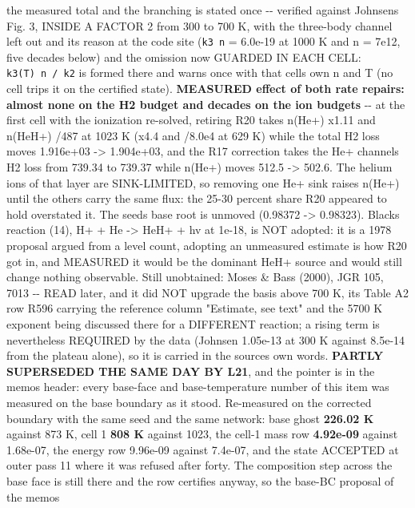 \documentclass[english,a4paper]{my_memo}
\begin{document}
\begin{itemize}
  the measured total and the branching is stated once -\/- verified against
  Johnsen\textquotesingle s Fig. 3, INSIDE A FACTOR 2 from 300 to 700 K, with the three-body
  channel left out and its reason at the code site (\texttt{k3\ n} = 6.0e-19 at 1000 K
  and n = 7e12, five decades below) and the omission now GUARDED IN EACH CELL:
  \texttt{k3(T)\ n\ /\ k2} is formed there and warns once with that cell\textquotesingle s own n and T
  (no cell trips it on the certified state). \textbf{MEASURED effect of both rate
  repairs: almost none on the H2 budget and decades on the ion budgets} -\/-
  at the first cell with the ionization re-solved, retiring R20 takes n(He+)
  x1.11 and n(HeH+) /487 at 1023 K (x4.4 and /8.0e4 at 629 K) while the total
  H2 loss moves 1.916e+03 -\textgreater{} 1.904e+03, and the R17 correction takes the He+
  channels\textquotesingle{} H2 loss from 739.34 to 739.37 while n(He+) moves 512.5 -\textgreater{} 502.6.
  The helium ions of that layer are SINK-LIMITED, so removing one He+ sink
  raises n(He+) until the others carry the same flux: the 25-30 percent share
  R20 appeared to hold overstated it. The seed\textquotesingle s base root is unmoved
  (0.98372 -\textgreater{} 0.98323). Black\textquotesingle s reaction (14), H+ + He -\textgreater{} HeH+ + hv at 1e-18,
  is NOT adopted: it is a 1978 proposal argued from a level count, adopting an
  unmeasured estimate is how R20 got in, and MEASURED it would be the dominant
  HeH+ source and would still change nothing observable. Still unobtained:
  Moses \& Bass (2000), JGR 105, 7013 -\/- READ later, and it did NOT upgrade the
  basis above 700 K, its Table A2 row R596 carrying the reference column
  "Estimate, see text" and the 5700 K exponent being discussed there for a
  DIFFERENT reaction; a rising term is nevertheless REQUIRED by the data
  (Johnsen 1.05e-13 at 300 K against 8.5e-14 from the plateau alone), so it is
  carried in the source\textquotesingle s own words. \textbf{PARTLY SUPERSEDED THE SAME DAY BY L21},
  and the pointer is in the memo\textquotesingle s header: every base-face and base-temperature
  number of this item was measured on the base boundary as it stood.
  Re-measured on the corrected boundary with the same seed and the same
  network: base ghost \textbf{226.02 K} against 873 K, cell 1 \textbf{808 K} against
  1023, the cell-1 mass row \textbf{4.92e-09} against 1.68e-07, the energy row
  9.96e-09 against 7.4e-07, and the state ACCEPTED at outer pass 11 where it
  was refused after forty. The composition step across the base face is still
  there and the row certifies anyway, so the base-BC proposal of the memo\textquotesingle s

\end{itemize}
\end{document}

